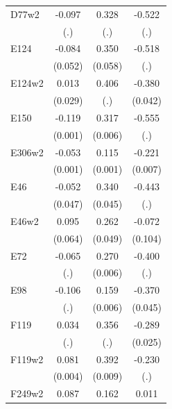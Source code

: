 \begin{table}[htbp]
\begin{tabular}{l*{3}{c}}
D77w2           &   -0.097         &    0.328         &   -0.522         \\
                &      (.)         &      (.)         &      (.)         \\
E124            &   -0.084         &    0.350\sym{***}&   -0.518         \\
                &  (0.052)         &  (0.058)         &      (.)         \\
E124w2          &    0.013         &    0.406         &   -0.380\sym{***}\\
                &  (0.029)         &      (.)         &  (0.042)         \\
E150            &   -0.119\sym{***}&    0.317\sym{***}&   -0.555         \\
                &  (0.001)         &  (0.006)         &      (.)         \\
E306w2          &   -0.053\sym{***}&    0.115\sym{***}&   -0.221\sym{***}\\
                &  (0.001)         &  (0.001)         &  (0.007)         \\
E46             &   -0.052         &    0.340\sym{***}&   -0.443         \\
                &  (0.047)         &  (0.045)         &      (.)         \\
E46w2           &    0.095         &    0.262\sym{***}&   -0.072         \\
                &  (0.064)         &  (0.049)         &  (0.104)         \\
E72             &   -0.065         &    0.270\sym{***}&   -0.400         \\
                &      (.)         &  (0.006)         &      (.)         \\
E98             &   -0.106         &    0.159\sym{***}&   -0.370\sym{***}\\
                &      (.)         &  (0.006)         &  (0.045)         \\
F119            &    0.034         &    0.356         &   -0.289\sym{***}\\
                &      (.)         &      (.)         &  (0.025)         \\
F119w2          &    0.081\sym{***}&    0.392\sym{***}&   -0.230         \\
                &  (0.004)         &  (0.009)         &      (.)         \\
F249w2          &    0.087\sym{***}&    0.162         &    0.011         \\

\end{tabular}
\end{table}
